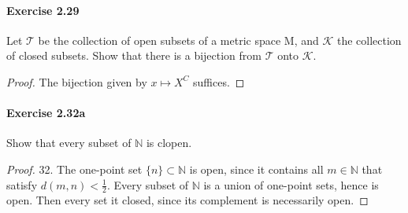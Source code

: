 \documentclass{article}
\begin{document}
\paragraph{Exercise 2.29} Let $\mathcal{T}$ be the collection of open subsets of a metric space $\mathrm{M}$, and $\mathcal{K}$ the collection of closed subsets. Show that there is a bijection from $\mathcal{T}$ onto $\mathcal{K}$.
\begin{proof}
   The bijection given by $x\mapsto X^C$ suffices.  
\end{proof}



\paragraph{Exercise 2.32a} Show that every subset of $\mathbb{N}$ is clopen.
\begin{proof}
    32. The one-point set $\{n\} \subset \mathbb{N}$ is open, since it contains all $m \in \mathbb{N}$ that satisfy $d(m, n)<\frac{1}{2}$. Every subset of $\mathbb{N}$ is a union of one-point sets, hence is open. Then every set it closed, since its complement is necessarily open.
\end{proof}
\end{document}
